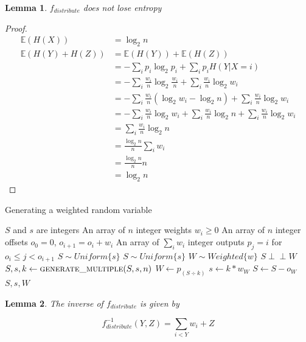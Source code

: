 \documentclass[12pt]{article}
\newtheorem{lemma}{Lemma}
\newcommand{\indep}{\perp\!\!\!\perp}
\begin{document}
\begin{lemma}
    \label{lem:distribution-conservation}
    $f_{distribute}$ does not lose entropy
\end{lemma}

\begin{proof}
    \begin{align}
    \mathbb{E}(H(X)) & = \log_2 n \\
    \mathbb{E}(H(Y) + H(Z)) &=  \mathbb{E}(H(Y)) + \mathbb{E}(H(Z)) \\
               & = - \sum_i p_i \log_2p_i + \sum_i p_iH(Y|X=i) \\
               & = - \sum_i \frac{w_i}{n} \log_2 \frac{w_i}{n} + \sum_i \frac{w_i}{n}\log_2 w_i \\
               & = - \sum_i \frac{w_i}{n}(\log_2 w_i - \log_2 n) + \sum_i \frac{w_i}{n}\log_2 w_i \\
               & = - \sum_i \frac{w_i}{n}\log_2 w_i + \sum_i \frac{w_i}{n} \log_2 n + \sum_i \frac{w_i}{n}\log_2 w_i \\
               & = \sum_i \frac{w_i}{n} \log_2 n \\
               & = \frac{\log_2 n}{n} \sum_i w_i \\
               & = \frac{\log_2 n}{n} n \\
               & = \log_2 n
    \end{align}
\end{proof}

\begin{algorithm}
\caption{Generating a weighted random variable}
\label{alg:generate-weighted}
\begin{algorithmic}[1]
\Require $S$ and $s$ are integers
\Require An array of $n$ integer weights $w_i \ge 0$
\Require An array of $n$ integer offsets $o_0 = 0$, $o_{i+1} = o_i + w_i$
\Require An array of $\sum_i w_i$ integer outputs $p_j = i$ for $o_i \le j < o_{i+1}$
\Require $S \sim Uniform\{s\}$
\Ensure $S \sim Uniform\{s\}$
\Ensure $W \sim Weighted\{w\}$
\Ensure $S \indep W$
    \State $S, s, k \gets \textsc{generate\_multiple}(S, s, n)$
    \State $W \gets p_{(S \div k)}$
    \State $s \gets k * w_W$
    \State $S \gets S - o_W$ 
    \State \Return $S, s, W$
\EndProcedure
\end{algorithmic}
\end{algorithm}

\begin{lemma}
The inverse of $f_{distribute}$ is given by

    \begin{equation}
    f^{-1}_{distribute}(Y,Z) = \sum_{i<Y}w_i + Z
    \end{equation}
\end{lemma}
\end{document}
